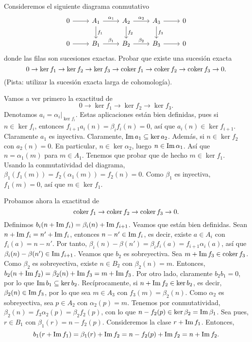 \documentclass[twoside]{article}
\begin{document}
\newpage

\begin{ejercicio}{4.2}
Consideremos el siguiente diagrama conmutativo
\[
\begin{tikzcd}
0\arrow[r] & A_1\arrow[d,"f_1"]\arrow[r, "\alpha_1"] & A_2\arrow[d,"f_2"]\arrow[r, "\alpha_2"] & A_3\arrow[d,"f_3"]\arrow[r] & 0\\
0\arrow[r] & B_1\arrow[r, "\beta_1"] & B_2\arrow[r, "\beta_2"] & B_3\arrow[r] & 0
\end{tikzcd}
\]
donde las filas son sucesiones exactas. Probar que existe una sucesión exacta
\[
0\to \ker{f_1}\to \ker{f_2}\to \ker{f_3}\to \operatorname{coker}{f_1}\to \operatorname{coker}{f_2}\to \operatorname{coker}{f_3}\to 0.
\]
(Pista: utilizar la sucesión exacta larga de cohomología).
\end{ejercicio}
\begin{solucion}
Vamos a ver primero la exactitud de
\[
0\to \ker{f_1}\to \ker{f_2}\to \ker{f_3}.
\]
Denotamos $a_i=\alpha_i|_{\ker{f_i}}$. Estas aplicaciones están bien definidas, pues si $n\in\ker{f_i}$, entonces $f_{i+1}a_i(n)=\beta_if_i(n)=0$, así que $a_i(n)\in\ker{f_{i+1}}$. Claramente $a_1$ es inyectiva. Claramente, $\operatorname{Im}{a_1}\subseteq\ker{a_2}$. Además, si $n\in\ker{f_2}$ con $a_2(n)=0$. En particular, $n\in\ker{\alpha_2}$, luego $n\in\operatorname{Im}{\alpha_1}$. Así que $n=\alpha_1(m)$ para $m\in A_1$. Tenemos que probar que de hecho $m\in\ker{f_1}$. Usando la conmutatividad del diagrama, $\beta_1(f_1(m))=f_2(\alpha_1(m))=f_2(n)=0$. Como $\beta_1$ es inyectiva, $f_1(m)=0$, así que $m\in\ker{f_1}$.

Probamos ahora la exactitud de
\[
\operatorname{coker}{f_1}\to \operatorname{coker}{f_2}\to \operatorname{coker}{f_3}\to 0.
\]
Definimos $b_i(n+\operatorname{Im}{f_i})=\beta_i(n)+\operatorname{Im}{f_{i+1}}$. Veamos que están bien definidas. Sean $n+\operatorname{Im}{f_i}=n'+\operatorname{Im}{f_i}$, entonces $n-n'\in\operatorname{Im}{f_i}$, es decir, existe $a\in A_i$ con $f_i(a)=n-n'$. Por tanto, $\beta_i(n)-\beta(n')=\beta_if_i(a)=f_{i+1}\alpha_i(a)$, así que $\beta_i(n)-\beta(n')\in\operatorname{Im}{f_{i+1}}$. Veamos que $b_2$ es sobreyectiva. Sea $m+\operatorname{Im}{f_3}\in\operatorname{coker}{f_3}$. Como $\beta_2$ es sobreyectiva, existe $n\in B_2$ con $\beta_2(n)=m$. Entonces, $b_2(n+\operatorname{Im}{f_2})=\beta_2(n)+\operatorname{Im}{f_3}=m+\operatorname{Im}{f_3}$. Por otro lado, claramente $b_2b_1=0$, por lo que $\operatorname{Im}{b_1}\subseteq\ker{b_2}$. Recíprocamente, si $n+\operatorname{Im}{f_2}\in\ker{b_2}$, es decir, $\beta_2(n)\in\operatorname{Im}{f_3}$, por lo que sea $m\in A_3$ con $f_3(m)=\beta_2(n)$. Como $\alpha_2$ es sobreyectiva, sea $p\in A_2$ con $\alpha_2(p)=m$. Tenemos por conmutatividad, $\beta_2(n)=f_3\alpha_2(p)=\beta_2f_2(p)$, con lo que $n-f_2(p)\in\ker{\beta_2}=\operatorname{Im}{\beta_1}$. Sea pues, $r\in B_1$ con $\beta_1(r)=n-f_2(p)$. Consideremos la clase $r+\operatorname{Im}{f_1}$. Entonces, $$b_1(r+\operatorname{Im}{f_1})=\beta_1(r)+\operatorname{Im}{f_2}=n-f_2(p)+\operatorname{Im}{f_2}=n+\operatorname{Im}{f_2}.$$


\end{solucion}
\end{document}
